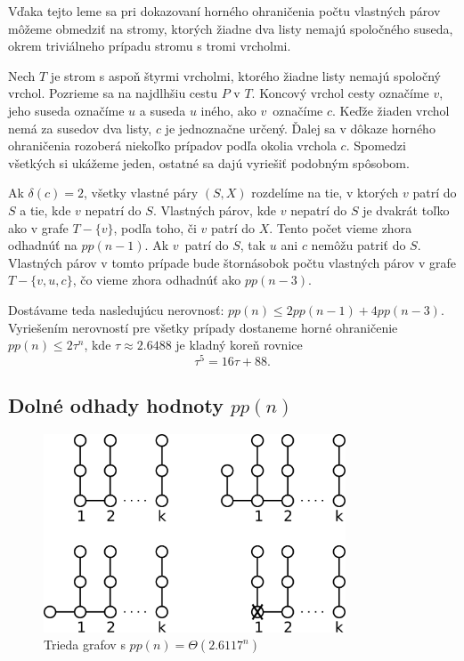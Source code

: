 Vďaka tejto leme sa pri dokazovaní horného ohraničenia počtu vlastných párov môžeme obmedziť
na stromy, ktorých žiadne dva listy nemajú spoločného suseda, okrem triviálneho prípadu
stromu s tromi vrcholmi.

Nech $T$ je strom s aspoň štyrmi vrcholmi, ktorého žiadne listy nemajú spoločný vrchol. Pozrieme
sa na najdlhšiu cestu $P$ v $T$. Koncový vrchol cesty označíme $v$, jeho suseda označíme $u$ a suseda $u$
iného, ako $v$ označíme $c$. Keďže žiaden vrchol nemá za susedov dva listy, $c$ je jednoznačne určený.
Ďalej sa v dôkaze horného ohraničenia rozoberá niekoľko prípadov podľa okolia vrchola $c$. Spomedzi
všetkých si ukážeme jeden, ostatné sa dajú vyriešiť podobným spôsobom.

Ak $\delta(c) = 2$, všetky vlastné páry $(S,X)$ rozdelíme na tie,
v ktorých $v$ patrí do $S$ a tie, kde $v$ nepatrí do $S$. Vlastných párov, kde $v$ nepatrí do $S$ je
dvakrát toľko ako v grafe $T - \{v\}$, podľa toho, či $v$ patrí do $X$. Tento počet vieme zhora
odhadnúť na $pp(n-1)$. Ak $v$ patrí do $S$, tak $u$ ani $c$ nemôžu patriť do $S$. Vlastných párov
v tomto prípade bude štornásobok počtu vlastných párov v grafe $T - \{v, u, c\}$, čo vieme zhora
odhadnúť ako $pp(n-3)$.

Dostávame teda nasledujúcu nerovnosť: $pp(n) \leq 2pp(n-1) + 4 pp(n-3)$. Vyriešením nerovností pre
všetky prípady dostaneme horné ohraničenie $pp(n) \leq 2 \tau^n$\cite{junosza_fast}, kde $\tau \approx 2.6488$ je kladný koreň rovnice
$$\tau^5 = 16\tau + 88.$$

\subsection{Dolné odhady hodnoty $pp(n)$}

\begin{figure}

\centerline{\includegraphics[width=0.8\textwidth]{images/pp_hreben.pdf}}

\caption[Trieda grafov s vysokým $pp(n)$]{Trieda grafov s $pp(n) = \Theta(2.6117^n)$}

\label{pp:hreben}

\end{figure}

